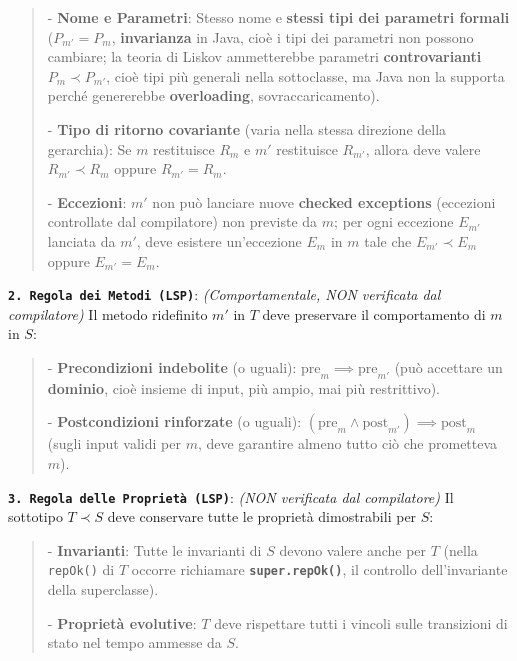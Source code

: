 \begin{quote}\small



- \textbf{Nome e Parametri}: Stesso nome e \textbf{stessi tipi dei parametri formali} ($P_{m'} = P_m$, \textbf{invarianza} in Java, cioè i tipi dei parametri non possono cambiare; la teoria di Liskov ammetterebbe parametri \textbf{controvarianti} $P_m \prec P_{m'}$, cioè tipi più generali nella sottoclasse, ma Java non la supporta perché genererebbe \textbf{overloading}, sovraccaricamento).

- \textbf{Tipo di ritorno covariante} (varia nella stessa direzione della gerarchia): Se $m$ restituisce $R_m$ e $m'$ restituisce $R_{m'}$, allora deve valere $R_{m'} \prec R_m$ oppure $R_{m'} = R_m$.

- \textbf{Eccezioni}: $m'$ non può lanciare nuove \textbf{checked exceptions} (eccezioni controllate dal compilatore) non previste da $m$; per ogni eccezione $E_{m'}$ lanciata da $m'$, deve esistere un'eccezione $E_m$ in $m$ tale che $E_{m'} \prec E_m$ oppure $E_{m'} = E_m$.

\end{quote}

\textbf{\texttt{2. Regola dei Metodi (LSP)}}: \emph{(Comportamentale, NON verificata dal compilatore)} Il metodo ridefinito $m'$ in $T$ deve preservare il comportamento di $m$ in $S$:

\begin{quote}\small



- \textbf{Precondizioni indebolite} (o uguali): $\text{pre}_m \implies \text{pre}_{m'}$ (può accettare un \textbf{dominio}, cioè insieme di input, più ampio, mai più restrittivo).

- \textbf{Postcondizioni rinforzate} (o uguali): $(\text{pre}_m \land \text{post}_{m'}) \implies \text{post}_m$ (sugli input validi per $m$, deve garantire almeno tutto ciò che prometteva $m$).

\end{quote}

\textbf{\texttt{3. Regola delle Proprietà (LSP)}}: \emph{(NON verificata dal compilatore)} Il sottotipo $T \prec S$ deve conservare tutte le proprietà dimostrabili per $S$:

\begin{quote}\small



- \textbf{Invarianti}: Tutte le invarianti di $S$ devono valere anche per $T$ (nella \texttt{repOk()} di $T$ occorre richiamare \textbf{\texttt{super.repOk()}}, il controllo dell'invariante della superclasse).

- \textbf{Proprietà evolutive}: $T$ deve rispettare tutti i vincoli sulle transizioni di stato nel tempo ammesse da $S$.

\end{quote}

